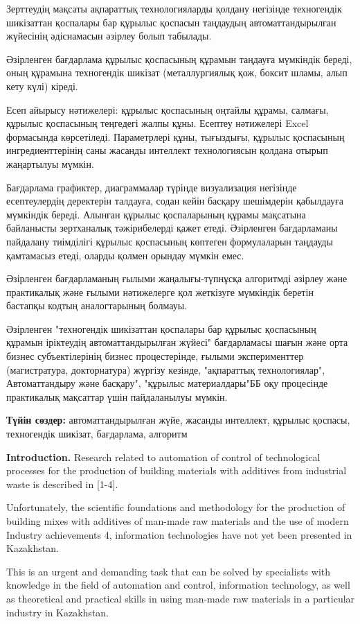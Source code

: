 {Зерттеудің мақсаты ақпараттық технологияларды қолдану негізінде
техногендік шикізаттан қоспалары бар құрылыс қоспасын таңдаудың
автоматтандырылған жүйесінің әдіснамасын әзірлеу болып табылады.

Әзірленген бағдарлама құрылыс қоспасының құрамын таңдауға мүмкіндік
береді, оның құрамына техногендік шикізат (металлургиялық қож, боксит
шламы, алып кету күлі) кіреді.

Есеп айырысу нәтижелері: құрылыс қоспасының оңтайлы құрамы, салмағы,
құрылыс қоспасының теңгедегі жалпы құны. Есептеу нәтижелері Excel
формасында көрсетіледі. Параметрлері құны, тығыздығы, құрылыс қоспасының
ингредиенттерінің саны жасанды интеллект технологиясын қолдана отырып
жаңартылуы мүмкін.

Бағдарлама графиктер, диаграммалар түрінде визуализация негізінде
есептеулердің деректерін талдауға, содан кейін басқару шешімдерін
қабылдауға мүмкіндік береді. Алынған құрылыс қоспаларының құрамы
мақсатына байланысты зертханалық тәжірибелерді қажет етеді. Әзірленген
бағдарламаны пайдалану тиімділігі құрылыс қоспасының көптеген
формулаларын таңдауды қамтамасыз етеді, оларды қолмен орындау мүмкін
емес.

Әзірленген бағдарламаның ғылыми жаңалығы-түпнұсқа алгоритмді әзірлеу
және практикалық және ғылыми нәтижелерге қол жеткізуге мүмкіндік беретін
бастапқы кодтың аналогтарының болмауы.

Әзірленген "техногендік шикізаттан қоспалары бар құрылыс қоспасының
құрамын іріктеудің автоматтандырылған жүйесі" бағдарламасы шағын және
орта бизнес субъектілерінің бизнес процестерінде, ғылыми эксперименттер
(магистратура, докторнатура) жүргізу кезінде, "ақпараттық
технологиялар", Автоматтандыру және басқару", "құрылыс материалдары"ББ
оқу процесінде практикалық мақсаттар үшін пайдаланылуы мүмкін.

{\bfseries Түйін сөздер:} автоматтандырылған жүйе, жасанды интеллект,
құрылыс қоспасы, техногендік шикізат, бағдарлама, алгоритм

{\bfseries Introduction.} Research related to automation of control of
technological processes for the production of building materials with
additives from industrial waste is described in {[}1-4{]}.

Unfortunately, the scientific foundations and methodology for the
production of building mixes with additives of man-made raw materials
and the use of modern Industry achievements 4, information technologies
have not yet been presented in Kazakhstan.

This is an urgent and demanding task that can be solved by specialists
with knowledge in the field of automation and control, information
technology, as well as theoretical and practical skills in using
man-made raw materials in a particular industry in Kazakhstan.

}
